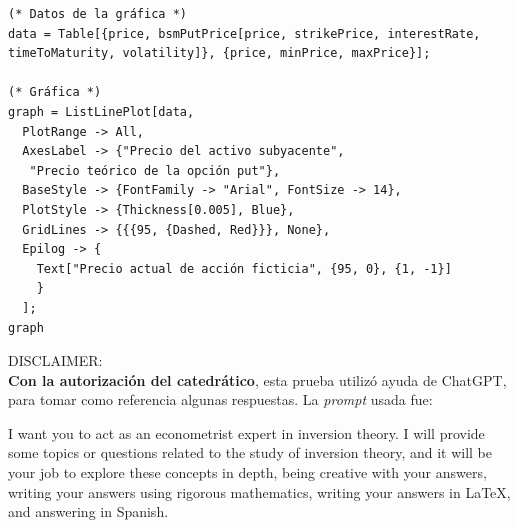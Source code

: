 \begin{itemize}
\begin{verbatim}
(* Datos de la gráfica *)
data = Table[{price, bsmPutPrice[price, strikePrice, interestRate,
timeToMaturity, volatility]}, {price, minPrice, maxPrice}];

(* Gráfica *)
graph = ListLinePlot[data,
  PlotRange -> All,
  AxesLabel -> {"Precio del activo subyacente",
   "Precio teórico de la opción put"},
  BaseStyle -> {FontFamily -> "Arial", FontSize -> 14},
  PlotStyle -> {Thickness[0.005], Blue},
  GridLines -> {{{95, {Dashed, Red}}}, None},
  Epilog -> {
    Text["Precio actual de acción ficticia", {95, 0}, {1, -1}]
    }
  ];
graph
    \end{verbatim}
    
\end{itemize}

\begin{cajita}
    DISCLAIMER:\\
    \textbf{Con la autorización del catedrático}, esta prueba utilizó ayuda de ChatGPT, para tomar como referencia algunas respuestas. La \textit{prompt} usada fue: 
    \begin{paragraph}
        I want you to act as an econometrist expert in inversion theory. I will provide some topics or questions related to the study of inversion theory, and it will be your job to explore these concepts in depth, being creative with your answers, writing your answers using rigorous mathematics, writing your answers in LaTeX, and answering in Spanish.
    \end{paragraph}
\end{cajita}

%
%

